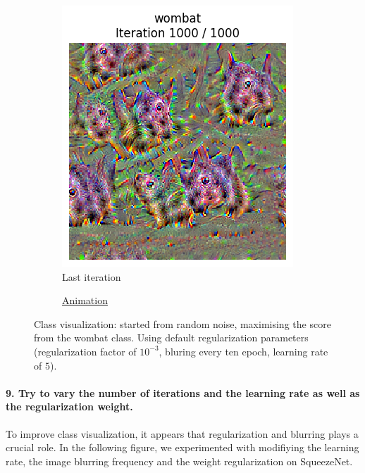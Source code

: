 \begin{figure}[H]
    \centering
    \begin{subfigure}{.5\textwidth}
        \centering
        \includegraphics[width=.7\linewidth]{SqueezeNet/wombat_animated_1000_last_frame.png}
        \caption{Last iteration}
        \label{fig:class_viz_wombat:png}
    \end{subfigure}%
    \begin{subfigure}{.5\textwidth}
        \centering
        \caption{\href{figs/2b/SqueezeNet/wombat_animated_1000.mp4}{Animation}}
        \label{fig:class_viz_wombat:vid}
    \end{subfigure}
    \caption{Class visualization: started from random noise, maximising the score from the wombat class. Using default regularization parameters (regularization factor of $10^{-3}$, bluring every ten epoch, learning rate of $5$).}
    \label{fig:class_viz_wombat}
\end{figure}

\paragraph*{9. Try to vary the number of iterations and the learning rate as well as the regularization weight.}
To improve class visualization, it appears that regularization and blurring plays a crucial role. In the following figure, we experimented with modifiying the learning rate, the image blurring frequency and the weight regularization on SqueezeNet.%

